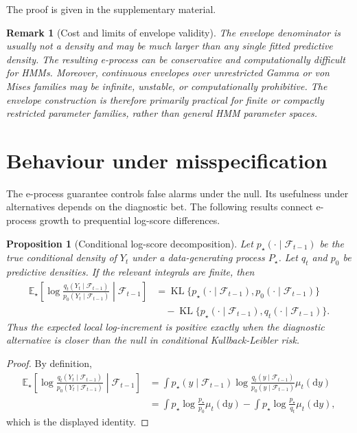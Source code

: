 \documentclass[pdflatex,sn-basic]{sn-jnl}
\theoremstyle{thmstyleone}
\newtheorem{proposition}[theorem]{Proposition}
\theoremstyle{thmstyletwo}
\newtheorem{remark}{Remark}
\theoremstyle{thmstylethree}
\newcommand{\E}{\mathbb E}
\newcommand{\1}{\mathbf 1}
\newcommand{\calF}{\mathcal F}
\newcommand{\KL}{\operatorname{KL}}
\begin{document}
\noindent The proof is given in the supplementary material.

\begin{remark}[Cost and limits of envelope validity]
The envelope denominator is usually not a density and may be much larger than any single fitted predictive density. The resulting e-process can be conservative and computationally difficult for HMMs. Moreover, continuous envelopes over unrestricted Gamma or von Mises families may be infinite, unstable, or computationally prohibitive. The envelope construction is therefore primarily practical for finite or compactly restricted parameter families, rather than general HMM parameter spaces.
\end{remark}

\section{Behaviour under misspecification}
\label{sec:power}

The e-process guarantee controls false alarms under the null. Its usefulness under alternatives depends on the diagnostic bet. The following results connect e-process growth to prequential log-score differences.

\begin{proposition}[Conditional log-score decomposition]
\label{prop:kl_decomposition}
Let $p_\star(\cdot\mid\calF_{t-1})$ be the true conditional density of $Y_t$ under a data-generating process $P_\star$. Let $q_t$ and $p_0$ be predictive densities. If the relevant integrals are finite, then
\begin{align}
 \E_\star\left[\log\frac{q_t(Y_t\mid\calF_{t-1})}{p_0(Y_t\mid\calF_{t-1})}\middle|\calF_{t-1}\right]
 &=\KL\{p_\star(\cdot\mid\calF_{t-1}),p_0(\cdot\mid\calF_{t-1})\}\\
 &\quad -\KL\{p_\star(\cdot\mid\calF_{t-1}),q_t(\cdot\mid\calF_{t-1})\}.
\end{align}
Thus the expected local log-increment is positive exactly when the diagnostic alternative is closer than the null in conditional Kullback-Leibler risk.
\end{proposition}

\begin{proof}
By definition,
\begin{align}
\E_\star\left[\log\frac{q_t(Y_t\mid\calF_{t-1})}{p_0(Y_t\mid\calF_{t-1})}\middle|\calF_{t-1}\right]
&=\int p_\star(y\mid\calF_{t-1})\log\frac{q_t(y\mid\calF_{t-1})}{p_0(y\mid\calF_{t-1})}\mu_t(\mathrm dy)\\
&=\int p_\star\log\frac{p_\star}{p_0}\mu_t(\mathrm dy)-\int p_\star\log\frac{p_\star}{q_t}\mu_t(\mathrm dy),
\end{align}
which is the displayed identity.
\end{proof}
\end{document}
